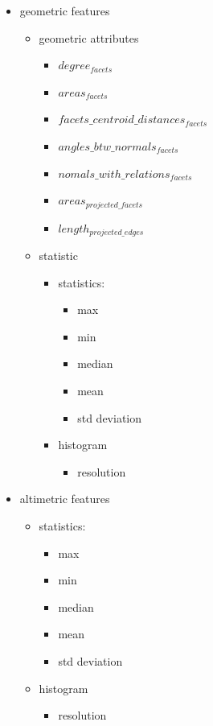 \documentclass[../main.tex]{subfile}
\begin{document}
    \begin{itemize}
        \item geometric features
        \begin{itemize}
            \item geometric attributes
            \begin{itemize}
                \item $degree_{facets}$
                \item $areas_{facets}$
                \item $facets\_centroid\_distances_{facets}$
                \item $angles\_btw\_normals_{facets}$
                \item $nomals\_with\_relations_{facets}$
                \item $areas_{projected\_facets}$
                \item $length_{projected\_edges}$
            \end{itemize}
            \item statistic
            \begin{itemize}
                \item statistics:
                \begin{itemize}
                    \item max
                    \item min
                    \item median
                    \item mean
                    \item std deviation
                \end{itemize}
                \item histogram
                \begin{itemize}
                    \item resolution
                \end{itemize}
            \end{itemize}
        \end{itemize}
        \item altimetric features
        \begin{itemize}
            \item statistics:
            \begin{itemize}
                \item max
                \item min
                \item median
                \item mean
                \item std deviation
            \end{itemize}
            \item histogram
            \begin{itemize}
                \item resolution
            \end{itemize}
        \end{itemize}
    \end{itemize}
\end{document}
